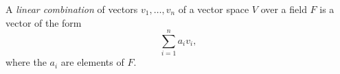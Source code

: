 \documentclass[12pt]{article}
\renewcommand{\vec}[1]{#1}
\begin{document}
A \emph{linear combination} of vectors $\vec{v}_1,\dots,\vec{v}_n$ 
of a vector space $V$ over a field $F$ is a vector of the form
$$\sum_{i=1}^n a_i\vec{v}_i,$$
where the $a_i$ are elements of $F$.
\end{document}
